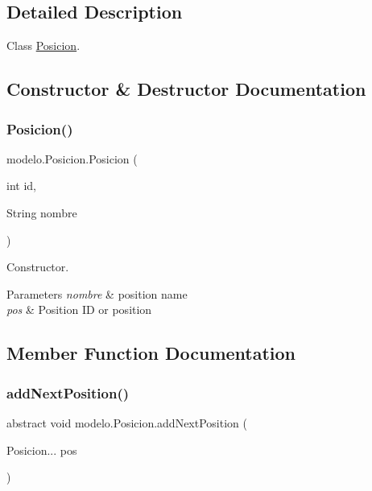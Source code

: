 \subsection{Detailed Description}
Class \mbox{\hyperlink{classmodelo_1_1_posicion}{Posicion}}. 

\subsection{Constructor \& Destructor Documentation}
\mbox{\label{classmodelo_1_1_posicion_a8071cf7469c2dddabf012cde36d1ed78}} 
\subsubsection{\texorpdfstring{Posicion()}{Posicion()}}
{\footnotesize\ttfamily modelo.\+Posicion.\+Posicion (\begin{DoxyParamCaption}\item[{int}]{id,  }\item[{String}]{nombre }\end{DoxyParamCaption})}



Constructor. 


\begin{DoxyParams}{Parameters}
{\em nombre} & position name \\
\hline
{\em pos} & Position ID or position \\
\hline
\end{DoxyParams}


\subsection{Member Function Documentation}
\mbox{\label{classmodelo_1_1_posicion_a6523ec41020a97ad305b9997c88f363c}} 
\subsubsection{\texorpdfstring{add\+Next\+Position()}{addNextPosition()}}
{\footnotesize\ttfamily abstract void modelo.\+Posicion.\+add\+Next\+Position (\begin{DoxyParamCaption}\item[{Posicion...}]{pos }\end{DoxyParamCaption})\hspace{0.3cm}{\ttfamily [abstract]}}




